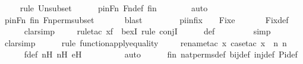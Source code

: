 \begin{isabellebody}
\ \ \ \ \isamarkupfalse%
{\isacharparenleft}{\kern0pt}rule\ Un{\isacharunderscore}{\kern0pt}subset{\isacharparenright}{\kern0pt}\isanewline
\ \ \ \ \isamarkupfalse%
\ pinFn\ Fn{\isacharunderscore}{\kern0pt}def\ fin\ \isanewline
\ \ \ \ \ \isamarkupfalse%
\ auto{\isacharbrackleft}{\kern0pt}{}{\isacharbrackright}{\kern0pt}\isanewline
\ \ \ \ \isamarkupfalse%
\ pinFn\ fin\ Fn{\isacharunderscore}{\kern0pt}perm{\isacharunderscore}{\kern0pt}subset\ \isanewline
\ \ \ \ \isamarkupfalse%
\ blast\isanewline
\ \ \ \ \isamarkupfalse%
\isanewline
\isanewline
\ \ \isamarkupfalse%
\ piinfix\ {\isacharcolon}{\kern0pt}\ {\isachardoublequoteopen}{\isasympi}\ {\isasymin}\ Fix{\isacharparenleft}{\kern0pt}e{\isacharparenright}{\kern0pt}{\isachardoublequoteclose}\ \isanewline
\ \ \ \ \isamarkupfalse%
\ Fix{\isacharunderscore}{\kern0pt}def\isanewline
\ \ \ \ \isamarkupfalse%
\ clarsimp\isanewline
\ \ \ \ \isamarkupfalse%
{\isacharparenleft}{\kern0pt}rule{\isacharunderscore}{\kern0pt}tac\ x{\isacharequal}{\kern0pt}f\ \ bexI{\isacharcomma}{\kern0pt}\ rule\ conjI{\isacharparenright}{\kern0pt}\isanewline
\ \ \ \ \isamarkupfalse%
\ {\isasympi}{\isacharunderscore}{\kern0pt}def\ \isanewline
\ \ \ \ \ \ \isamarkupfalse%
\ simp\isanewline
\ \ \ \ \ \isamarkupfalse%
\ clarsimp\isanewline
\ \ \ \ \ \isamarkupfalse%
{\isacharparenleft}{\kern0pt}rule\ function{\isacharunderscore}{\kern0pt}apply{\isacharunderscore}{\kern0pt}equality{\isacharparenright}{\kern0pt}\isanewline
\ \ \ \ \isamarkupfalse%
{\isacharparenleft}{\kern0pt}rename{\isacharunderscore}{\kern0pt}tac\ x{\isacharcomma}{\kern0pt}\ case{\isacharunderscore}{\kern0pt}tac\ {\isachardoublequoteopen}x\ {\isasymin}\ {\isacharbraceleft}{\kern0pt}n{\isacharcomma}{\kern0pt}\ n{\isacharprime}{\kern0pt}{\isacharbraceright}{\kern0pt}{\isachardoublequoteclose}{\isacharparenright}{\kern0pt}\isanewline
\ \ \ \ \isamarkupfalse%
\ f{\isacharunderscore}{\kern0pt}def\ nH\ n{\isacharprime}{\kern0pt}H\ eH\ \isanewline
\ \ \ \ \ \ \ \isamarkupfalse%
\ auto{\isacharbrackleft}{\kern0pt}{}{\isacharbrackright}{\kern0pt}\isanewline
\ \ \ \ \isamarkupfalse%
\ fin\ nat{\isacharunderscore}{\kern0pt}perms{\isacharunderscore}{\kern0pt}def\ bij{\isacharunderscore}{\kern0pt}def\ inj{\isacharunderscore}{\kern0pt}def\ Pi{\isacharunderscore}{\kern0pt}def\isanewline

\end{isabellebody}
